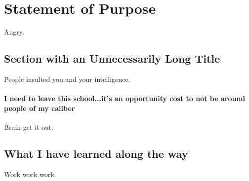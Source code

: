 \chapter{Statement of Purpose}

Angry. 

\section[I need to write]{Section with an Unnecessarily Long Title}

People insulted you and your intelligence. 

\subsubsection{I need to leave this school...it's an opportunity cost to not be around people of my caliber}

Brain get it out.

\section{What I have learned along the way}
Work work work.